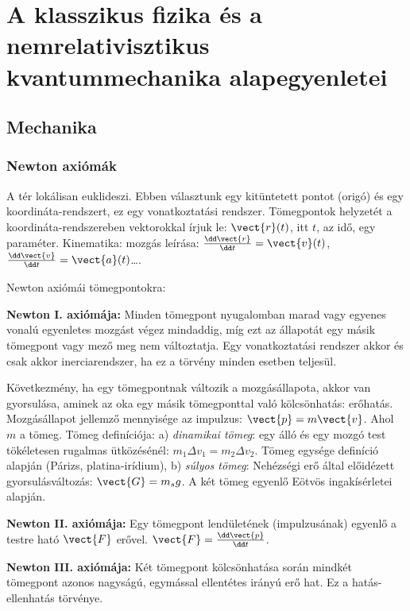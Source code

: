 \chapter{A klasszikus fizika \'es a nemrelativisztikus kvantummechanika alapegyenletei}\label{1tetel}
 
 \section{Mechanika}
  
  \subsection{Newton axiómák}
   
   A tér lokálisan euklideszi.
   Ebben választunk egy kitüntetett pontot (origó) és egy koordináta-rendszert, ez egy vonatkoztatási rendszer.
   Tömegpontok helyzetét a koordináta-rendszereben vektorokkal írjuk le: $\vect{r}(t)$, itt $t$, az idő, egy paraméter.
   Kinematika: mozgás leírása: $\frac{\dd\vect{r}}{\dd t}= \vect{v}(t)$, $\frac{\dd\vect{v}}{\dd t}= \vect{a}(t)$\dots. 
   
   Newton axiómái tömegpontokra:
   
   {\bf Newton I. axiómája:} Minden tömegpont nyugalomban marad vagy egyenes vonalú egyenletes mozgást végez mindaddig, míg ezt az állapotát egy másik tömegpont vagy mező meg nem változtatja.
   Egy vonatkoztatási rendszer akkor és csak akkor inerciarendszer, ha ez a törvény minden esetben teljesül.
   
   Következmény, ha egy tömegpontnak változik a mozgásállapota, akkor van gyorsulása, aminek az oka egy másik tömegponttal való kölcsönhatás: erőhatás.
   Mozgásállapot jellemző mennyisége az impulzus: $\vect{p}=m\vect{v}$.
   Ahol $m$ a tömeg.
   Tömeg definíciója: a) {\it dinamikai tömeg}: egy álló és egy mozgó test tökéletesen rugalmas ütközésénél: $m_1 \Delta v_1=m_2 \Delta v_2$.
   Tömeg egysége definíció alapján (Párizs, platina-irídium), b) {\it súlyos tömeg}: Nehézségi erő által előidézett gyorsulásváltozás: $\vect{G}=m_s g$.
   A két tömeg egyenlő Eötvös ingakísérletei alapján.
   
   {\bf Newton II. axiómája:} Egy tömegpont lendületének (impulzusának) egyenlő a testre ható $\vect{F}$ erővel. $\vect{F}=\frac{\dd \vect{p}}{\dd t}$. 
   
   {\bf Newton III. axiómája:} Két tömegpont kölcsönhatása során mindkét tömegpont azonos nagyságú, egymással ellentétes irányú erő hat.
   Ez a hatás-ellenhatás törvénye. 
   
